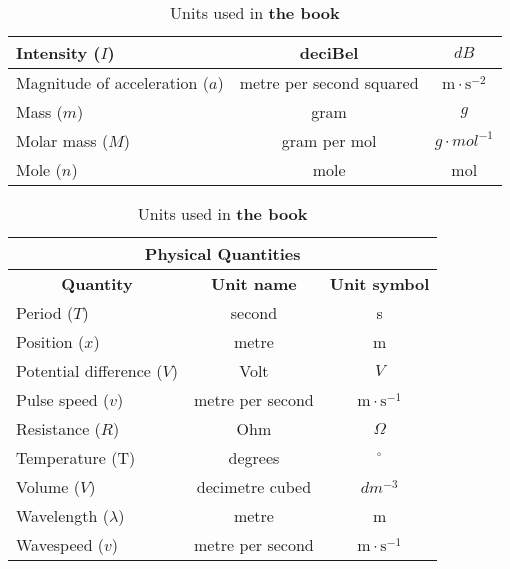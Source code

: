 {\begin{table}[H]
\begin{center}
\begin{tabular}{|l|c|c|}
Intensity ($I$)            & deciBel &   $dB$                         \\ \hline
Magnitude of acceleration ($a$)   & metre per second squared & $\text{m} \cdot \text{s}^{-2}$  \\ \hline
Mass ($m$)             & gram & $g$\\ \hline
Molar mass ($M$)             & gram per mol & $g \cdot mol^{-1}$              \\ \hline
Mole ($n$)             & mole & mol     \\ \hline
\end{tabular}
\end{center}
\caption{Units used in \textbf{the book} }
\label{table:book::units1}
\end{table}
\begin{table}[H]
\begin{center}
\begin{tabular}{|l|c|c|}\hline \hline 
\multicolumn{3}{|c|}{\textbf{Physical Quantities}}\\ \hline \hline
\multicolumn{1}{|c|}{\textbf{Quantity}} & \textbf{Unit name} & \textbf{Unit symbol}\\ \hline
Period ($T$)             & second &  s                               \\ \hline
Position ($x$)             & metre & m                               \\ \hline 
Potential difference ($V$)            & Volt & $V$   \\ \hline
Pulse speed ($v$)             & metre per second & $\text{m} \cdot \text{s}^{-1}$ \\ \hline
Resistance  ($R$)             & Ohm & $\Omega$ \\ \hline 
Temperature (T)               & degrees & $^{\circ}$ \\ \hline
Volume ($V$)             & decimetre cubed & $dm^{-3}$  \\ \hline
Wavelength ($\lambda$)       & metre & m                                \\ \hline
Wavespeed ($v$)             & metre per second & $\text{m} \cdot \text{s}^{-1}$ \\ \hline
\end{tabular}
\end{center}
\caption{Units used in \textbf{the book} }
\label{table:book::units2}
\end{table}}
